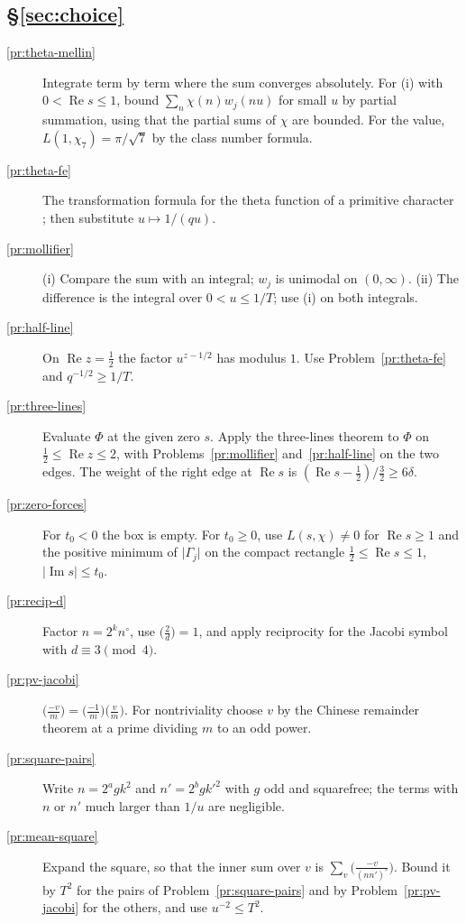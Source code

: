 \documentclass[reqno]{amsart}
\theoremstyle{definition}
\theoremstyle{plain}
\theoremstyle{remark}
\renewcommand{\Re}{\operatorname{Re}}
\renewcommand{\Im}{\operatorname{Im}}
\newcommand{\leg}[2]{\bigl(\tfrac{#1}{#2}\bigr)}
\begin{document}
\subsection*{\S\ref{sec:choice}}
\begin{description}
\item[\ref{pr:theta-mellin}] Integrate term by term where the sum converges absolutely.  For (i) with $0 < \Re s \le 1$, bound $\sum_n \chi(n) w_j(nu)$ for small $u$ by partial summation, using that the partial sums of $\chi$ are bounded.  For the value, $L(1, \chi_7) = \pi/\sqrt 7$ by the class number formula.
\item[\ref{pr:theta-fe}] The transformation formula for the theta function of a primitive character \cite[Ch.~9]{Dav}; then substitute $u \mapsto 1/(qu)$.
\item[\ref{pr:mollifier}] (i) Compare the sum with an integral; $w_j$ is unimodal on $(0, \infty)$.  (ii) The difference is the integral over $0 < u \le 1/T$; use (i) on both integrals.
\item[\ref{pr:half-line}] On $\Re z = \frac12$ the factor $u^{z - 1/2}$ has modulus $1$.  Use Problem~\ref{pr:theta-fe} and $q^{-1/2} \ge 1/T$.
\item[\ref{pr:three-lines}] Evaluate $\Phi$ at the given zero $s$.  Apply the three-lines theorem to $\Phi$ on $\frac12 \le \Re z \le 2$, with Problems~\ref{pr:mollifier} and~\ref{pr:half-line} on the two edges.  The weight of the right edge at $\Re s$ is $(\Re s - \frac12)/\frac32 \ge 6\delta$.
\item[\ref{pr:zero-forces}] For $t_0 < 0$ the box is empty.  For $t_0 \ge 0$, use $L(s, \chi) \ne 0$ for $\Re s \ge 1$ and the positive minimum of $\lvert \Gamma_j \rvert$ on the compact rectangle $\frac12 \le \Re s \le 1$, $\lvert \Im s \rvert \le t_0$.
\item[\ref{pr:recip-d}] Factor $n = 2^k n^\circ$, use $\leg{2}{d} = 1$, and apply reciprocity for the Jacobi symbol with $d \equiv 3 \pmod 4$.
\item[\ref{pr:pv-jacobi}] $\leg{-v}{m} = \leg{-1}{m}\leg{v}{m}$.  For nontriviality choose $v$ by the Chinese remainder theorem at a prime dividing $m$ to an odd power.
\item[\ref{pr:square-pairs}] Write $n = 2^a g k^2$ and $n' = 2^b g k'^2$ with $g$ odd and squarefree; the terms with $n$ or $n'$ much larger than $1/u$ are negligible.
\item[\ref{pr:mean-square}] Expand the square, so that the inner sum over $v$ is $\sum_v \leg{-v}{(nn')^\circ}$.  Bound it by $T^2$ for the pairs of Problem~\ref{pr:square-pairs} and by Problem~\ref{pr:pv-jacobi} for the others, and use $u^{-2} \le T^2$.

\end{description}
\end{document}
